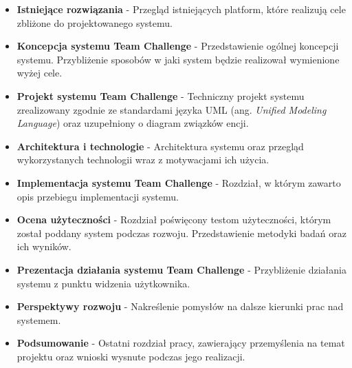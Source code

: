 \begin{itemize}

\item \textbf{Istniejące rozwiązania} - Przegląd istniejących platform, które realizują cele zbliżone do projektowanego systemu.  \\

\item \textbf{Koncepcja systemu Team Challenge} - Przedstawienie ogólnej koncepcji systemu. Przybliżenie sposobów w jaki system będzie realizował wymienione wyżej cele.   \\

\item \textbf{Projekt systemu Team Challenge} - Techniczny projekt systemu zrealizowany zgodnie ze standardami języka UML (ang. \textit{Unified Modeling Language}) oraz uzupełniony o diagram związków encji. \\

\item \textbf{Architektura i technologie} - Architektura systemu oraz przegląd wykorzystanych technologii wraz z motywacjami ich użycia.  \\

\item \textbf{Implementacja systemu Team Challenge} - Rozdział, w którym zawarto opis przebiegu implementacji systemu.   \\

\item \textbf{Ocena użyteczności} - Rozdział poświęcony testom użyteczności, którym został poddany system podczas rozwoju.  Przedstawienie metodyki badań oraz ich wyników. \\

\item \textbf{Prezentacja działania systemu Team Challenge} - Przybliżenie działania systemu z punktu widzenia użytkownika.   \\

\item \textbf{Perspektywy rozwoju} - Nakreślenie pomysłów na dalsze kierunki prac nad systemem.  \\

\item \textbf{Podsumowanie} - Ostatni rozdział pracy, zawierający przemyślenia na temat projektu oraz wnioski wysnute podczas jego realizacji.  \\

\end{itemize}


